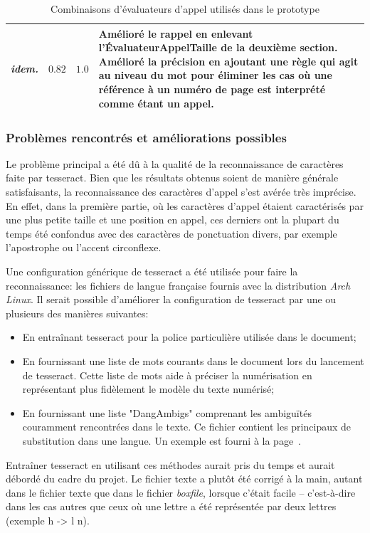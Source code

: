 \begin{table}
\begin{tabular}{| p{6cm} | p{2cm} | p{1.25cm} | p{6cm} |}
    \\ \hline
    \emph{idem.} & $0.82$ & $1.0$ &
    Amélioré le rappel en enlevant l'ÉvaluateurAppelTaille de la deuxième section. Amélioré la précision en ajoutant une règle qui agit au niveau du mot pour éliminer les cas où une référence à un numéro de page est interprété comme étant un appel.
    \\ \hline
\end{tabular}
\caption{Combinaisons d'évaluateurs d'appel utilisés dans le prototype}
\label{combinaisons-evaluateurs}
\end{table}

\subsubsection{Problèmes rencontrés et améliorations possibles}
Le problème principal a été dû à la qualité de la reconnaissance de caractères faite par tesseract. Bien que les résultats obtenus soient de manière générale satisfaisants, la reconnaissance des caractères d'appel s'est avérée très imprécise. En effet, dans la première partie, où les caractères d'appel étaient caractérisés par une plus petite taille et une position en appel, ces derniers ont la plupart du temps été confondus avec des caractères de ponctuation divers, par exemple l'apostrophe ou l'accent circonflexe.

Une configuration générique de tesseract a été utilisée pour faire la reconnaissance: les fichiers de langue française fournis avec la distribution \emph{Arch Linux}. Il serait possible d'améliorer la configuration de tesseract par une ou plusieurs des manières suivantes:
\begin{itemize}
    \item En entraînant tesseract pour la police particulière utilisée dans le document;
    \item En fournissant une liste de mots courants dans le document lors du lancement de tesseract. Cette liste de mots aide à préciser la numérisation en représentant plus fidèlement le modèle du texte numérisé;
    \item En fournissant une liste "DangAmbigs" comprenant les ambiguïtés couramment rencontrées dans le texte. Ce fichier contient les principaux de substitution dans une langue. Un exemple est fourni à la page~\pageref{figure-dangambigs}.
\end{itemize}

Entraîner tesseract en utilisant ces méthodes aurait pris du temps et aurait débordé du cadre du projet. Le fichier texte a plutôt été corrigé à la main, autant dans le fichier texte que dans le fichier \emph{boxfile}, lorsque c'était facile -- c'est-à-dire dans les cas autres que ceux où une lettre a été représentée par deux lettres (exemple h -> l n).

